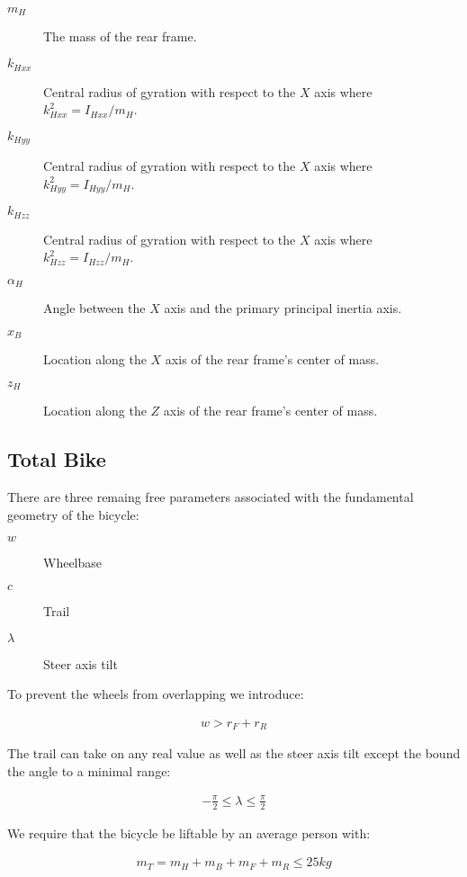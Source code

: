 \documentclass{icsc}
\begin{document}
\begin{description}
  \item[$m_H$] The mass of the rear frame.
  \item[$k_{Hxx}$] Central radius of gyration with respect to the $X$ axis where $k_{Hxx}^2=I_{Hxx} / m_H$.
  \item[$k_{Hyy}$] Central radius of gyration with respect to the $X$ axis where $k_{Hyy}^2=I_{Hyy} / m_H$.
  \item[$k_{Hzz}$] Central radius of gyration with respect to the $X$ axis where $k_{Hzz}^2=I_{Hzz} / m_H$.
  \item[$\alpha_H$] Angle between the $X$ axis and the primary principal inertia axis.
  \item[$x_B$] Location along the $X$ axis of the rear frame's center of mass.
  \item[$z_H$] Location along the $Z$ axis of the rear frame's center of mass.
\end{description}




\subsection{Total Bike}

There are three remaing free parameters associated with the fundamental geometry of the bicycle:

\begin{description}
  \item[$w$] Wheelbase
  \item[$c$] Trail
  \item[$\lambda$] Steer axis tilt
\end{description}

To prevent the wheels from overlapping we introduce:

\begin{align}
  w > r_F + r_R
\end{align}

The trail can take on any real value as well as the steer axis tilt except the bound the angle to a minimal range:

\begin{align}
  -\frac{\pi}{2} \leq \lambda \leq \frac{\pi}{2}
\end{align}

We require that the bicycle be liftable by an average person with:

\begin{align}
  m_T = m_H + m_B + m_F + m_R \leq 25 \si{kg}
\end{align}
\end{document}
